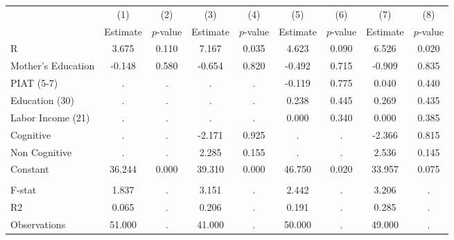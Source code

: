 \begin{tabular}{lcccccccc} \toprule
 & (1) & (2) & (3) & (4) & (5) & (6) & (7) & (8) \\ 
 & Estimate  & $p$-value  & Estimate  & $p$-value  & Estimate  & $p$-value  & Estimate  & $p$-value  \\  \midrule
R &     3.675 &     0.110 &     7.167 &     0.035 &     4.623 &     0.090 &     6.526 &     0.020 \\  
Mother's Education &    -0.148 &     0.580 &    -0.654 &     0.820 &    -0.492 &     0.715 &    -0.909 &     0.835 \\  
PIAT (5-7) &         . &         . &         . &         . &    -0.119 &     0.775 &     0.040 &     0.440 \\  
Education (30) &         . &         . &         . &         . &     0.238 &     0.445 &     0.269 &     0.435 \\  
Labor Income (21) &         . &         . &         . &         . &     0.000 &     0.340 &     0.000 &     0.385 \\  
Cognitive &         . &         . &    -2.171 &     0.925 &         . &         . &    -2.366 &     0.815 \\  
Non Cognitive &         . &         . &     2.285 &     0.155 &         . &         . &     2.536 &     0.145 \\  
Constant &    36.244 &     0.000 &    39.310 &     0.000 &    46.750 &     0.020 &    33.957 &     0.075 \\  \\ \midrule
F-stat &     1.837 &         . &     3.151 &         . &     2.442 &         . &     3.206 &         . \\  
R2 &     0.065 &         . &     0.206 &         . &     0.191 &         . &     0.285 &         . \\  
Observations &    51.000 &         . &    41.000 &         . &    50.000 &         . &    49.000 &         . \\  
\bottomrule \end{tabular}
